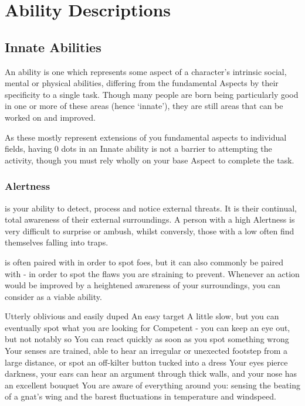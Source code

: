 \section{Ability Descriptions}

\subsection{Innate Abilities}

An  ability is one which represents some aspect of a character's intrinsic social, mental or physical abilities, differing from the fundamental Aspects by their specificity to a single task. Though many people are born being particularly good in one or more of these areas (hence `innate'), they are still areas that can be worked on and improved. 

As these mostly represent extensions of you fundamental aspects to individual fields, having 0 dots in an Innate ability is not a barrier to attempting the activity, though you must rely wholly on your base Aspect to complete the task. 

\subsubsection{Alertness}

 is your ability to detect, process and notice external threats. It is their continual, total awareness of their external surroundings. A person with a high Alertness is very difficult to surprise or ambush, whilst conversly, those with a low  often find themselves falling into traps.

 is often paired with  in order to spot foes, but it can also commonly be paired with  - in order to spot the flaws you are straining to prevent. Whenever an action would be improved by a heightened awareness of your surroundings, you can consider  as a viable ability. 

\ratingTable
{Utterly oblivious and easily duped}
{An easy target}
{A little slow, but you can eventually spot what you are looking for}
{Competent - you can keep an eye out, but not notably so}
{You can react quickly as soon as you spot something wrong}
{Your senses are trained, able to hear an irregular or unexected footstep from a large distance, or spot an off-kilter button tucked into a dress}
{Your eyes pierce darkness, your ears can hear an argument through thick walls, and your nose has an excellent bouquet}
{You are aware of everything around you: sensing the beating of a gnat's wing and the barest fluctuations in temperature and windspeed.}


